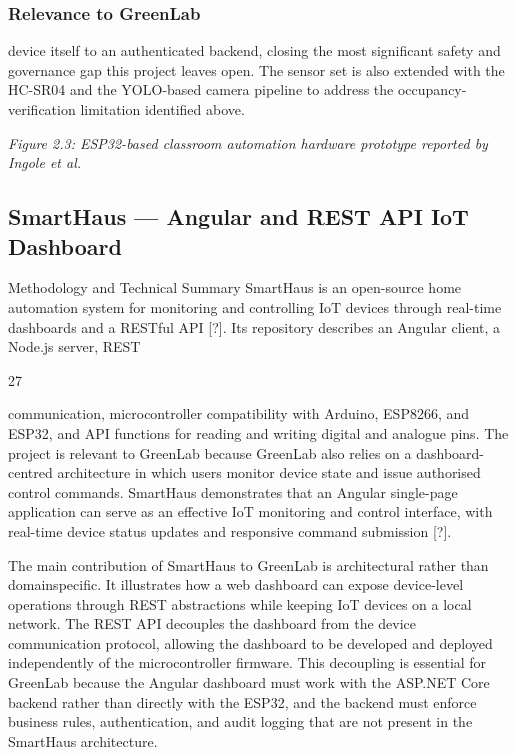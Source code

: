 \subsubsection*{Relevance to GreenLab}

device itself to an authenticated backend, closing the most signiﬁcant safety and governance gap this project leaves open. The sensor set is also extended with the HC-SR04 and
the YOLO-based camera pipeline to address the occupancy-veriﬁcation limitation identiﬁed
above.





\textit{Figure 2.3: ESP32-based classroom automation hardware prototype reported by Ingole et al.}




\subsection{SmartHaus --- Angular and REST API IoT Dashboard}


Methodology and Technical Summary SmartHaus is an open-source home automation system for monitoring and controlling IoT devices through real-time dashboards and
a RESTful API [?]. Its repository describes an Angular client, a Node.js server, REST

27


communication, microcontroller compatibility with Arduino, ESP8266, and ESP32, and
API functions for reading and writing digital and analogue pins. The project is relevant to
GreenLab because GreenLab also relies on a dashboard-centred architecture in which users
monitor device state and issue authorised control commands. SmartHaus demonstrates that
an Angular single-page application can serve as an effective IoT monitoring and control
interface, with real-time device status updates and responsive command submission [?].

The main contribution of SmartHaus to GreenLab is architectural rather than domainspeciﬁc. It illustrates how a web dashboard can expose device-level operations through
REST abstractions while keeping IoT devices on a local network. The REST API decouples the dashboard from the device communication protocol, allowing the dashboard to be
developed and deployed independently of the microcontroller ﬁrmware. This decoupling is
essential for GreenLab because the Angular dashboard must work with the ASP.NET Core
backend rather than directly with the ESP32, and the backend must enforce business rules,
authentication, and audit logging that are not present in the SmartHaus architecture.

